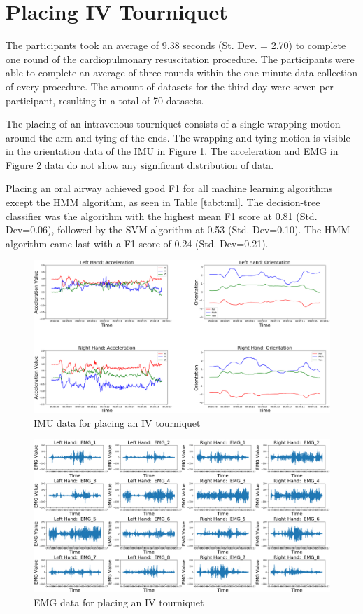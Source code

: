 \section{Placing IV Tourniquet}
\label{sec:Results:Tourniquet}
The participants took an average of 9.38 seconds (St. Dev. = 2.70) to complete one round of the cardiopulmonary resuscitation procedure. The participants were able to complete an average of three rounds within the one minute data collection of every procedure. The amount of datasets for the third day were seven per participant, resulting in a total of 70 datasets.
\par The placing of an intravenous tourniquet consists of a single wrapping motion around the arm and tying of the ends. The wrapping and tying motion is visible in the orientation data of the IMU in Figure \ref{fig:4501imuday3t7}. The acceleration and EMG in Figure \ref{fig:4501emgday3t7} data do not show any significant distribution of data.
\par Placing an oral airway achieved good F1 for all machine learning algorithms except the HMM algorithm, as seen in Table \ref{tab:t:ml}. The decision-tree classifier was the algorithm with the highest mean F1 score at 0.81 (Std. Dev=0.06), followed by the SVM algorithm at 0.53 (Std. Dev=0.10). The HMM algorithm came last with a F1 score of 0.24 (Std. Dev=0.21).
\begin{figure}
	\centering
	\includegraphics[width=0.8\linewidth]{pictures/4501_IMU_Day3_t_7}
	\caption{IMU data for placing an IV tourniquet}
	\label{fig:4501imuday3t7}
\end{figure}
\begin{figure}
	\centering
	\includegraphics[width=0.8\linewidth]{pictures/4501_EMG_Day3_t_7}
	\caption{EMG data for placing an IV tourniquet}
	\label{fig:4501emgday3t7}
\end{figure}
